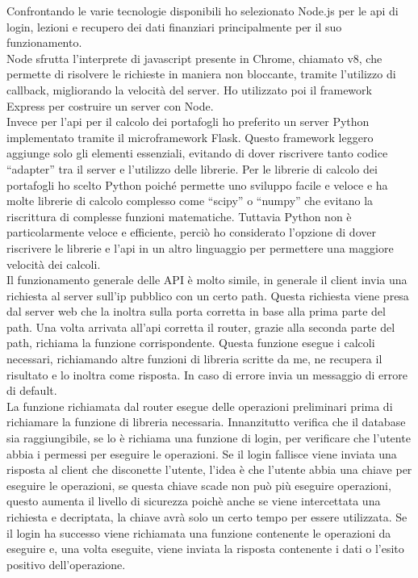\noindent
Confrontando le varie tecnologie disponibili ho selezionato Node.js per le api di login, lezioni e recupero dei dati finanziari principalmente per il suo funzionamento.\\
Node sfrutta l’interprete di javascript presente in Chrome, chiamato v8, che permette di risolvere le richieste in maniera non bloccante, tramite l’utilizzo di callback, migliorando la velocità del server. Ho utilizzato poi il framework Express per costruire un server con Node.\\
Invece per l’api per il calcolo dei portafogli ho preferito un server Python implementato tramite il microframework Flask. Questo framework leggero aggiunge solo gli elementi essenziali, evitando di dover riscrivere tanto codice “adapter” tra il server e l’utilizzo delle librerie. Per le librerie di calcolo dei portafogli ho scelto Python poiché permette uno sviluppo facile e veloce e ha molte librerie di calcolo complesso come “scipy” o “numpy” che evitano la riscrittura di complesse funzioni matematiche. Tuttavia Python non è particolarmente veloce e efficiente, perciò ho considerato l’opzione di dover riscrivere le librerie e l’api in un altro linguaggio per permettere una maggiore velocità dei calcoli.\\

\noindent
Il funzionamento generale delle API è molto simile, in generale il client invia una richiesta al server sull'ip pubblico con un certo path. Questa richiesta viene presa dal server web che la inoltra sulla porta corretta in base alla prima parte del path. Una volta arrivata all'api corretta il router, grazie alla seconda parte del path, richiama la funzione corrispondente. Questa funzione esegue i calcoli necessari, richiamando altre funzioni di libreria scritte da me, ne recupera il risultato e lo inoltra come risposta. In caso di errore invia un messaggio di errore di default.\\
La funzione richiamata dal router esegue delle operazioni preliminari prima di richiamare la funzione di libreria necessaria. Innanzitutto verifica che il database sia raggiungibile, se lo è richiama una funzione di login, per verificare che l'utente abbia i permessi per eseguire le operazioni. Se il login fallisce viene inviata una risposta al client che disconette l'utente, l'idea è che l'utente abbia una chiave per eseguire le operazioni, se questa chiave scade non può più eseguire operazioni, questo aumenta il livello di sicurezza poichè anche se viene intercettata una richiesta e decriptata, la chiave avrà solo un certo tempo per essere utilizzata. Se il login ha successo viene richiamata una funzione contenente le operazioni da eseguire e, una volta eseguite, viene inviata la risposta contenente i dati o l'esito positivo dell'operazione.

